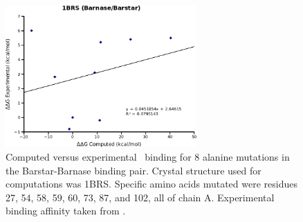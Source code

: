 


\begin{figure}[h]
  \centering
  \includegraphics[width=0.65\textwidth]{figures/1brs_barnase_barstar.png}
  \caption{
Computed versus experimental \ddg\ binding for 8 alanine mutations in the Barstar-Barnase binding pair.
Crystal structure used for computations was 1BRS.
Specific amino acids mutated were residues 27, 54, 58, 59, 60, 73, 87, and 102, all of chain A.
Experimental binding affinity taken from \protect\cite{thorn2001asedb}.
            }
\end{figure}

